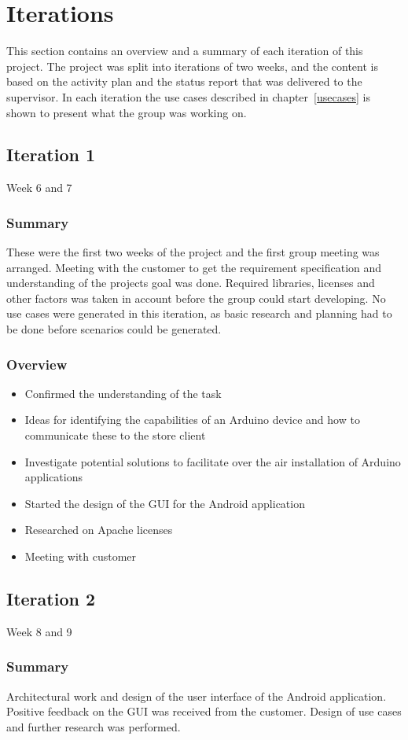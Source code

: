 \chapter{Iterations}
\label{apendix-iterations}
This section contains an overview and a summary of each iteration of this project. The project was split into
iterations of two weeks, and the content is based on the activity plan and the status report that was delivered to the supervisor. In each iteration the use cases described in chapter~\ref{usecases} is shown to present what the group was working on.

\section{Iteration 1}
Week 6 and 7
\subsection{Summary}
	These were the first two weeks of the project and the first group meeting was arranged.	Meeting with the customer to get the requirement specification and understanding of the projects goal was done.	Required libraries, licenses and other factors was taken in account before the group could start developing. No use cases were generated in this iteration, as basic research and planning had to be done before scenarios could be generated.
\subsection{Overview}
\begin{itemize}
	\item{Confirmed the understanding of the task}
	\item{Ideas for identifying the capabilities of an Arduino device and how to communicate these to the store client}
	\item{Investigate potential solutions to facilitate over the air installation of Arduino applications}
	\item{Started the design of the GUI for the Android application}
	\item{Researched on Apache licenses}
	\item{Meeting with customer}
\end{itemize}

\section{Iteration 2}
Week 8 and 9
\subsection{Summary}
	Architectural work and design of the user interface of the Android application. Positive feedback on the GUI was received from the customer. Design of use cases and further research was performed.
